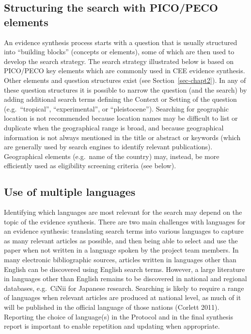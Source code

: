 \documentclass[
  letterpaper,
  DIV=11,
  numbers=noendperiod]{scrreprt}
\begin{document}
\subsection{Structuring the search with PICO/PECO
elements}\label{structuring-the-search-with-picopeco-elements}

An evidence synthesis process starts with a question that is usually
structured into ``building blocks'' (concepts or elements), some of
which are then used to develop the search strategy. The search strategy
illustrated below is based on PICO/PECO key elements which are commonly
used in CEE evidence synthesis. Other elements and question structures
exist (see Section~\ref{sec-chapt2}). In any of these question
structures it is possible to narrow the question (and the search) by
adding additional search terms defining the Context or Setting of the
question (e.g.~``tropical'', ``experimental'', or ``pleistocene'').
Searching for geographic location is not recommended because location
names may be difficult to list or duplicate when the geographical range
is broad, and because geographical information is not always mentioned
in the title or abstract or keywords (which are generally used by search
engines to identify relevant publications). Geographical elements
(e.g.~name of the country) may, instead, be more efficiently used as
eligibility screening criteria (see below).

\subsection{Use of multiple languages}\label{use-of-multiple-languages}

Identifying which languages are most relevant for the search may depend
on the topic of the evidence synthesis. There are two main challenges
with languages for an evidence synthesis: translating search terms into
various languages to capture as many relevant articles as possible, and
then being able to select and use the paper when not written in a
language spoken by the project team members. In many electronic
bibliographic sources, articles written in languages other than English
can be discovered using English search terms. However, a large
literature in languages other than English remains to be discovered in
national and regional databases, e.g.~CiNii for Japanese research.
Searching is likely to require a range of languages when relevant
articles are produced at national level, as much of it will be published
in the official language of those nations (Corlett 2011). Reporting the
choice of language(s) in the Protocol and in the final synthesis report
is important to enable repetition and updating when appropriate.
\end{document}
